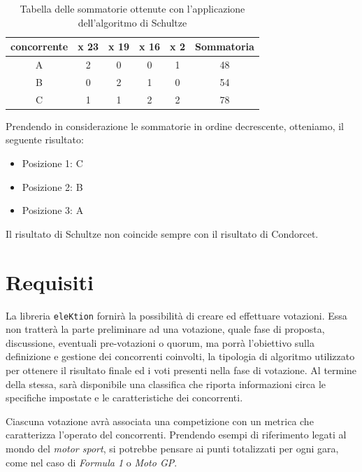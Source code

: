 \documentclass[12pt,a4paper,openright,twoside]{book}
\begin{document}
\begin{table}[H]
    \centering
    \begin{tabular}{|c|c|c|c|c|c|}
    \hline
    \multicolumn{1}{|l|}{concorrente} & \multicolumn{1}{|l|}{x 23} & \multicolumn{1}{|l|}{x 19} & \multicolumn{1}{l|}{x 16} & \multicolumn{1}{l|}{x 2} & \multicolumn{1}{l|}{Sommatoria} \\ \hline
    A & 2 & 0 & 0 & 1 & 48                              \\ \hline
    B & 0 & 2 & 1 & 0 & 54                              \\ \hline
    C & 1 & 1 & 2 & 2 & 78                             \\ \hline
  
    \end{tabular}
    \caption{Tabella delle sommatorie ottenute con l'applicazione dell'algoritmo di Schultze}
    \label{table:risultatischultze}
\end{table}

Prendendo in considerazione le sommatorie in ordine decrescente, otteniamo, il seguente risultato:
\begin{itemize}
    \item{Posizione 1: C}
    \item{Posizione 2: B}
    \item{Posizione 3: A}
\end{itemize} 

Il risultato di Schultze non coincide sempre con il risultato di Condorcet.

\newpage
\section{Requisiti}
La libreria \texttt{eleKtion} fornirà la possibilità di creare ed effettuare votazioni.
Essa non tratterà la parte preliminare ad una votazione, quale fase di proposta, discussione,
eventuali pre-votazioni o quorum, ma porrà l'obiettivo sulla definizione e gestione dei concorrenti coinvolti,
la tipologia di algoritmo utilizzato per ottenere il risultato finale ed i voti presenti nella fase di votazione.
Al termine della stessa, sarà disponibile una classifica che riporta informazioni 
circa le specifiche impostate e le caratteristiche dei concorrenti.


Ciascuna votazione avrà associata una competizione con un metrica che caratterizza l'operato del concorrenti.
Prendendo esempi di riferimento legati al mondo del \textit{motor sport},
si potrebbe pensare ai punti totalizzati per ogni gara, come nel caso di \textit{Formula 1} o \textit{Moto GP}.
\end{document}
